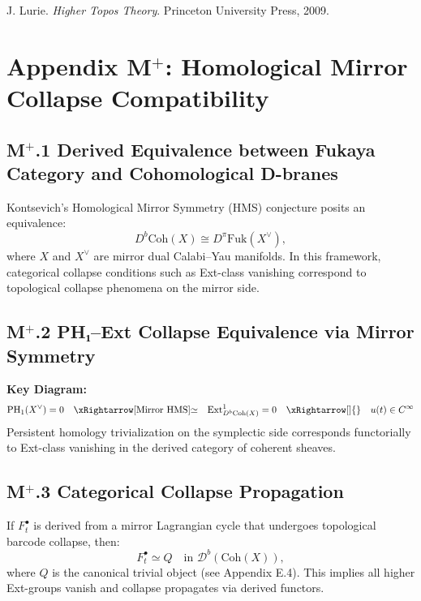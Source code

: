 \documentclass[11pt]{article}
\begin{document}
\begin{axiom}
\begin{axiom}
{{\begin{thebibliography}{9}
J. Lurie.  
\textit{Higher Topos Theory}. Princeton University Press, 2009.

\end{thebibliography}



\section*{Appendix M$^+$: Homological Mirror Collapse Compatibility}

\subsection*{M$^+$.1 Derived Equivalence between Fukaya Category and Cohomological D-branes}
Kontsevich's Homological Mirror Symmetry (HMS) conjecture posits an equivalence:
\[
D^b\mathrm{Coh}(X) \cong D^\pi\mathrm{Fuk}(X^\vee),
\]
where \( X \) and \( X^\vee \) are mirror dual Calabi–Yau manifolds. In this framework, categorical collapse conditions such as Ext-class vanishing correspond to topological collapse phenomena on the mirror side.

\subsection*{M$^+$.2 PH₁–Ext Collapse Equivalence via Mirror Symmetry}
\textbf{Key Diagram:}
\[
\mathrm{PH}_1(X^\vee) = 0 \quad \xRightarrow[\text{Mirror HMS}]{\simeq} \quad \mathrm{Ext}^1_{D^b\mathrm{Coh}(X)} = 0 \quad \xRightarrow[]{} \quad u(t) \in C^\infty
\]
Persistent homology trivialization on the symplectic side corresponds functorially to Ext-class vanishing in the derived category of coherent sheaves.

\subsection*{M$^+$.3 Categorical Collapse Propagation}
If \( F^\bullet_t \) is derived from a mirror Lagrangian cycle that undergoes topological barcode collapse, then:
\[
F^\bullet_t \simeq Q \quad \text{in } \mathcal{D}^b(\mathrm{Coh}(X)),
\]
where \( Q \) is the canonical trivial object (see Appendix E.4). This implies all higher Ext-groups vanish and collapse propagates via derived functors.

}}
\end{axiom}
\end{axiom}
\end{document}

